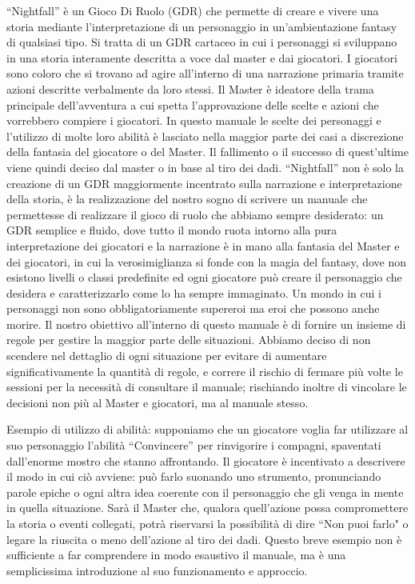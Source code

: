 \documentclass[../manuale_main.tex]{subfiles}
\begin{document}
“Nightfall” è un Gioco Di Ruolo (GDR) che permette di creare e vivere una storia mediante l'interpretazione di un personaggio in un’ambientazione fantasy di qualsiasi tipo. Si tratta di un GDR cartaceo in cui i personaggi si sviluppano in una storia interamente descritta a voce dal master e dai giocatori. I giocatori sono coloro che si trovano ad agire all'interno di una narrazione primaria tramite azioni descritte verbalmente da loro stessi. Il Master è ideatore della trama principale dell'avventura a cui spetta l'approvazione delle scelte e azioni che vorrebbero compiere i giocatori.
In questo manuale le scelte dei personaggi e l'utilizzo di molte loro abilità è lasciato nella maggior parte dei casi a discrezione della fantasia del giocatore o del Master. Il fallimento o il successo di quest'ultime viene quindi deciso dal master o in base al tiro dei dadi.
“Nightfall”  non è solo la creazione di un GDR maggiormente incentrato sulla narrazione e interpretazione della storia, è la realizzazione del nostro sogno di scrivere un manuale che permettesse di realizzare il gioco di ruolo che abbiamo sempre desiderato: un  GDR semplice e fluido, dove tutto il mondo ruota intorno alla pura interpretazione dei giocatori e la narrazione è in mano alla fantasia del Master e dei giocatori, in cui la verosimiglianza si fonde con la magia del fantasy, dove non esistono livelli o classi predefinite ed ogni giocatore può creare il personaggio che desidera e caratterizzarlo come lo ha sempre immaginato. Un mondo in cui i personaggi non sono obbligatoriamente supereroi ma eroi che possono anche morire.
Il nostro obiettivo all'interno di questo manuale è di fornire un insieme di regole per gestire la maggior parte delle situazioni. Abbiamo deciso di non scendere nel dettaglio di ogni situazione per evitare di aumentare significativamente la quantità di regole, e correre il rischio di fermare più volte le sessioni  per la necessità di  consultare il manuale; rischiando inoltre di vincolare le decisioni non più al Master e giocatori, ma al manuale stesso.

Esempio di utilizzo di abilità:
supponiamo che un giocatore voglia far utilizzare al suo personaggio l'abilità  “Convincere” per rinvigorire i compagni, spaventati dall'enorme mostro che stanno affrontando. 
Il giocatore è incentivato a descrivere il modo in cui ciò avviene: può farlo suonando uno strumento, pronunciando parole epiche o ogni altra idea coerente con il personaggio che gli venga in mente in quella situazione. Sarà il Master che, qualora quell'azione possa compromettere la storia o eventi collegati, potrà riservarsi la possibilità di dire “Non puoi farlo" o legare la riuscita o meno dell'azione al tiro dei dadi. 
Questo breve esempio non è sufficiente a far comprendere in modo esaustivo il manuale, ma è una semplicissima introduzione al suo funzionamento e approccio.
\end{document}
